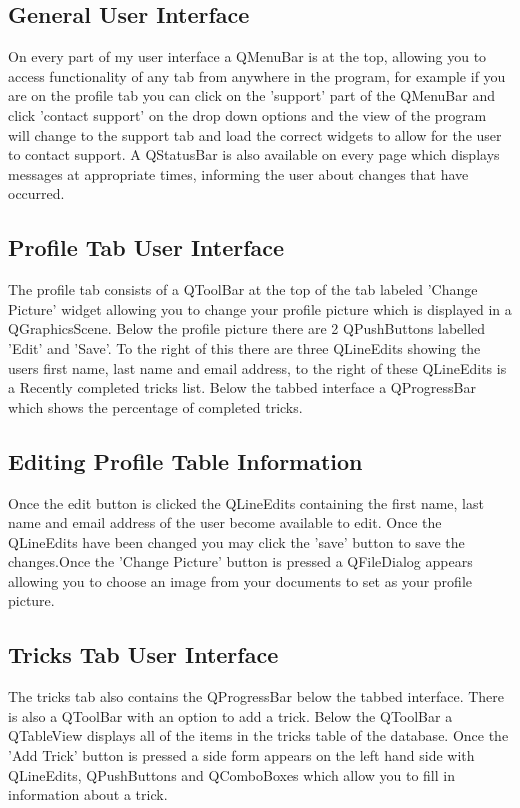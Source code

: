 \subsection{General User Interface}

On every part of my user interface a QMenuBar is at the top, allowing you to access functionality of any tab from anywhere in the program, for example if you are on the profile tab you can click on the 'support' part of the QMenuBar and click 'contact support' on the drop down options and the view of the program will change to the support tab and load the correct widgets to allow for the user to contact support. A QStatusBar is also available on every page which displays messages at appropriate times, informing the user about changes that have occurred.

\subsection{Profile Tab User Interface}

The profile tab consists of a QToolBar at the top of the tab labeled 'Change Picture' widget allowing you to change your profile picture which is displayed in a QGraphicsScene. Below the profile picture there are 2 QPushButtons labelled 'Edit' and 'Save'. To the right of this there are three QLineEdits showing the users first name, last name and email address, to the right of these QLineEdits is a Recently completed tricks list. Below the tabbed interface a QProgressBar which shows the percentage of completed tricks.

\subsection{Editing Profile Table Information}
Once the edit button is clicked the QLineEdits containing the first name, last name and email address of the user become available to edit. Once the QLineEdits have been changed you may click the 'save' button to save the changes.Once the 'Change Picture' button is pressed a QFileDialog appears allowing you to choose an image from your documents to set as your profile picture.



\subsection{Tricks Tab User Interface}

The tricks tab also contains the QProgressBar below the tabbed interface. There is also a QToolBar with an option to add a trick. Below the QToolBar a QTableView displays all of the items in the tricks table of the database. Once the 'Add Trick' button is pressed a side form appears on the left hand side with QLineEdits, QPushButtons and QComboBoxes which allow you to fill in information about a trick.

